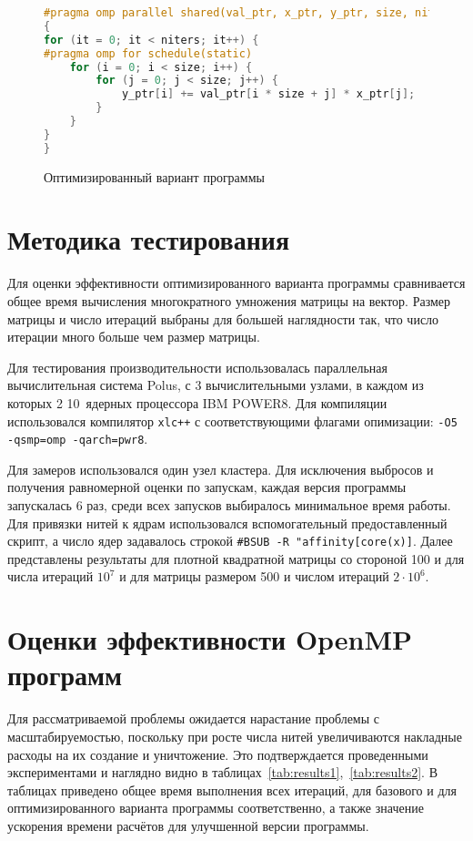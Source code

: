 \documentclass[12pt, oneside, a4paper]{article}
\begin{document}
\begin{figure}[h]
\begin{lstlisting}[language=C++]
#pragma omp parallel shared(val_ptr, x_ptr, y_ptr, size, niters) private(i, j, it)
{
for (it = 0; it < niters; it++) {
#pragma omp for schedule(static)
	for (i = 0; i < size; i++) {
		for (j = 0; j < size; j++) {
			y_ptr[i] += val_ptr[i * size + j] * x_ptr[j];
		}
	}
}
}
\end{lstlisting}
\caption{Оптимизированный вариант программы}
\label{fig:optimized}
\end{figure}

\section{Методика тестирования}

Для оценки эффективности оптимизированного варианта программы сравнивается общее время вычисления многократного умножения матрицы на вектор. Размер матрицы и число итераций выбраны для большей наглядности так, что число итерации много больше чем размер матрицы.

Для тестирования производительности использовалась параллельная вычислительная система Polus, с 3 вычислительными узлами, в каждом из которых 2 10~ядерных процессора IBM POWER8. Для компиляции использовался компилятор \texttt{xlc++} с соответствующими флагами опимизации: \texttt{-O5 -qsmp=omp -qarch=pwr8}.

Для замеров использовался один узел кластера. Для исключения выбросов и получения равномерной оценки по запускам, каждая версия программы запускалась 6 раз, среди всех запусков выбиралось минимальное время работы. Для привязки нитей к ядрам использовался вспомогательный предоставленный скрипт, а число ядер задавалось строкой \texttt{\#BSUB -R "affinity[core(x)]}. Далее представлены результаты для плотной квадратной матрицы со стороной 100 и для числа итераций $10^{7}$ и для матрицы размером 500 и числом итераций $2 \cdot 10^{6}$.

\section{Оценки эффективности OpenMP программ}

Для рассматриваемой проблемы ожидается нарастание проблемы с масштабируемостью, поскольку при росте числа нитей увеличиваются накладные расходы на их создание и уничтожение. Это подтверждается проведенными экспериментами и наглядно видно в таблицах~\ref{tab:results1},~\ref{tab:results2}. В таблицах приведено общее время выполнения всех итераций, для базового и для оптимизированного варианта программы соответственно, а также значение ускорения времени расчётов для улучшенной версии программы.
\end{document}

